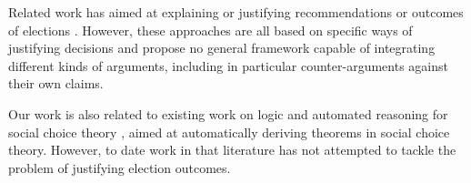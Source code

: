 \documentclass{comsoc2016}
\begin{document}
Related work has aimed at explaining or justifying recommendations \citep{bouyssou_conjoint_2005,keeney_decisions_1993,labreuche_general_2011, labreuche_explanation_2012} or outcomes of elections \citep{saari_explaining_1999, saari_decisions_2001}. However, these approaches are all based on specific ways of justifying decisions and propose no general framework capable of integrating different kinds of arguments, including in particular counter-arguments against their own claims.

Our work is also related to
existing work on logic and automated reasoning for social choice theory \citep{BrandtGeistAAMAS2014,EndrissLPT2011,TangLinAIJ2009}, aimed at automatically deriving theorems in social choice theory. However, to date work in that literature has not attempted to tackle the problem of justifying election outcomes.
\end{document}
